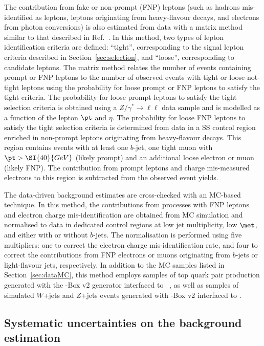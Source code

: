 The contribution from fake or non-prompt (FNP) leptons (such as hadrons mis-identified as leptons, 
leptons originating from heavy-flavour decays, and electrons from photon conversions) 
is also estimated from data with a matrix method similar to that described in Ref.~\cite{paperSS3L}. 
In this method, two types of lepton identification criteria are defined: ``tight'', 
corresponding to the signal lepton criteria described in Section~\ref{sec:selection}, 
and ``loose'', corresponding to candidate leptons. 
The matrix method relates the number of events containing prompt or FNP leptons 
to the number of observed events with tight or loose-not-tight leptons 
using the probability for loose prompt or FNP leptons to satisfy the tight criteria. 
The probability for loose prompt leptons to satisfy the tight selection criteria 
is obtained using a $Z/\gamma^*\to\ell\ell$ data sample 
and is modelled as a function of the lepton $\pt$ and $\eta$. 
The probability for loose FNP leptons to satisfy the tight selection criteria is determined from data 
in a SS control region enriched in non-prompt leptons originating from heavy-flavour decays. 
This region contains events with at least one $b$-jet, 
one tight muon with $\pt > \SI{40}{GeV}$ (likely prompt) and an additional loose electron or muon (likely FNP).
The contribution from prompt leptons and charge mis-measured electrons to this region is subtracted from the observed event yields.

The data-driven background estimates are cross-checked with an MC-based technique. 
In this method, the contributions from processes with FNP leptons and electron charge mis-identification 
are obtained from MC simulation and normalised to data in dedicated control regions at low jet multiplicity, low $\met$, and 
either with or without $b$-jets. 
The normalisation is performed using five multipliers: one to correct 
the electron charge mis-identification rate, and four to correct the contributions from FNP 
electrons or muons originating from $b$-jets or light-flavour jets, respectively.
In addition to the MC samples listed in Section~\ref{sec:dataMC}, this method employs samples of top quark pair production generated with the \POWHEG-Box v2 generator interfaced to ~\cite{Sjostrand:2006za}, 
as well as samples of simulated $W$+jets and $Z$+jets events generated with \POWHEG-Box v2 interfaced to .

\subsection{Systematic uncertainties on the background estimation}

